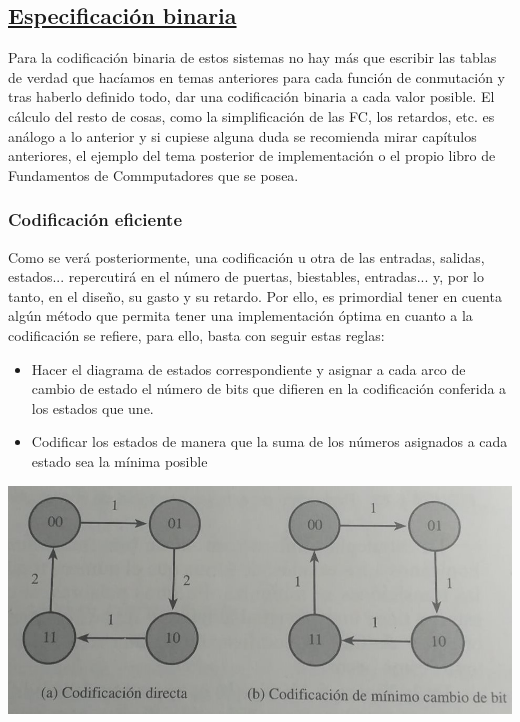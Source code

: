 \documentclass[a4paper,10pt]{book}
\begin{document}
\subsection*{\underline{Especificación binaria}}
Para la codificación binaria de estos sistemas no hay más que escribir las tablas de verdad que hacíamos en temas anteriores para cada función de conmutación y tras haberlo definido todo, dar una codificación binaria a cada valor posible.
El cálculo del resto de cosas, como la simplificación de las FC, los retardos, etc. es análogo a lo anterior y si cupiese alguna duda se recomienda mirar capítulos anteriores, el ejemplo del tema posterior de implementación o el propio libro de Fundamentos de Commputadores que se posea.

\subsubsection*{Codificación eficiente}
Como se verá posteriormente, una codificación u otra de las entradas, salidas, estados... repercutirá en el número de puertas, biestables, entradas... y, por lo tanto, en el diseño, su gasto y su retardo. Por ello, es primordial tener en cuenta algún método que permita tener una implementación óptima en cuanto a la codificación se refiere, para ello, basta con seguir estas reglas:
\begin{itemize}
\item Hacer el diagrama de estados correspondiente y asignar a cada arco de cambio de estado el número de bits que difieren en la codificación conferida a los estados que une.

\item Codificar los estados de manera que la suma de los números asignados a cada estado sea la mínima posible
\end{itemize}

\begin{center}
\includegraphics[scale=0.35]{codificacion eficiente}
\end{center}
\end{document}
